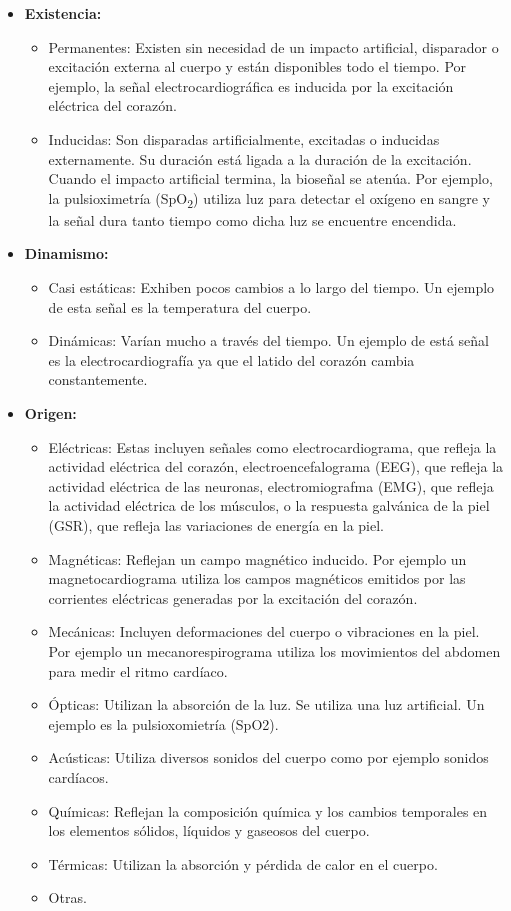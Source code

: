 \begin{itemize}
	\item \textbf{Existencia:}
		\begin{itemize}
			\item Permanentes: Existen sin necesidad de un impacto artificial, disparador o excitación externa al cuerpo y están disponibles todo el tiempo. Por ejemplo, la señal electrocardiográfica es inducida por la excitación eléctrica del corazón.
			\item Inducidas: Son disparadas artificialmente, excitadas o inducidas externamente. Su duración está ligada a la duración de la excitación. Cuando el impacto artificial termina, la bioseñal se atenúa. Por ejemplo, la pulsioximetría (SpO\textsubscript{2}) utiliza luz para detectar el oxígeno en sangre y la señal dura tanto tiempo como dicha luz se encuentre encendida.
		\end{itemize}
	\item \textbf{Dinamismo:}
		\begin{itemize}
			\item Casi estáticas:  Exhiben pocos cambios a lo largo del tiempo. Un ejemplo de esta señal es la temperatura del cuerpo.
			\item Dinámicas: Varían mucho a través del tiempo. Un ejemplo de está señal es la electrocardiografía ya que el latido del corazón cambia constantemente.
		\end{itemize}
	\item \textbf{Origen:}
		\begin{itemize}
			\item Eléctricas: Estas incluyen señales como electrocardiograma, que refleja la actividad eléctrica del corazón, electroencefalograma (EEG), que refleja la actividad eléctrica de las neuronas,  electromiografma (EMG), que refleja la actividad eléctrica de los músculos, o la respuesta galvánica de la piel (GSR), que refleja las variaciones de energía en la piel.
			\item Magnéticas: Reflejan un campo magnético inducido. Por ejemplo un magnetocardiograma utiliza los campos magnéticos emitidos por las corrientes eléctricas generadas por la excitación del corazón.
			\item Mecánicas: Incluyen deformaciones del cuerpo o vibraciones en la piel. Por ejemplo un mecanorespirograma utiliza los movimientos del abdomen para medir el ritmo cardíaco.
			\item Ópticas: Utilizan la absorción de la luz. Se utiliza una luz artificial. Un ejemplo es la pulsioxomietría (SpO2).
			\item Acústicas: Utiliza diversos sonidos del cuerpo como por ejemplo sonidos cardíacos.
			\item Químicas: Reflejan la composición química y los cambios temporales en los elementos sólidos, líquidos y gaseosos del cuerpo.
			\item Térmicas: Utilizan la absorción y pérdida de calor en el cuerpo.
			\item Otras.
	\end{itemize}
\end{itemize}

